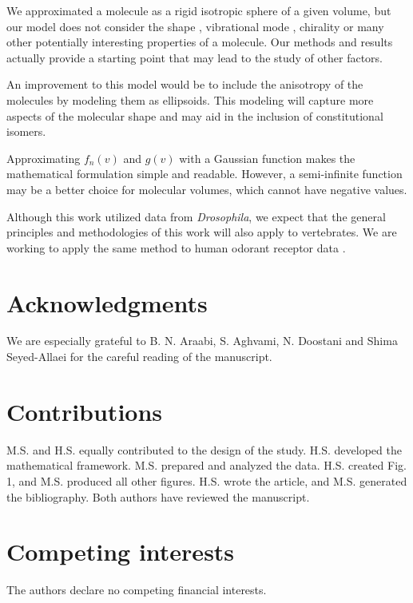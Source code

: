 \documentclass[fleqn,11pt]{wlscirep}
\begin{document}
We approximated a molecule as a rigid isotropic sphere of a given volume, but
our model does not consider the shape \cite{Keller2004, Araneda2000, uchida2000}, 
vibrational mode \cite{Turin,Franco2011,turin2015plausibility}, 
chirality \cite{tirandaz2015dissipative} or many other potentially interesting properties of a molecule.
Our methods and results actually provide a starting point that may lead to the study of other factors. 

An improvement to this model would be to include the anisotropy of the molecules 
by modeling them as ellipsoids. 
This modeling will capture more aspects of the molecular shape and may aid in the inclusion of constitutional isomers. 

Approximating $f_n(v)$ and $g(v)$ with a Gaussian function makes the mathematical formulation simple and readable. 
However, a semi-infinite function may be a better choice for molecular volumes, which cannot have negative values.

Although this work utilized data from \textit{Drosophila}, 
we expect that the general principles and methodologies of this work will also apply to vertebrates. 
We are working to apply the same method to human odorant receptor data \cite{mainland2015human}.

\section*{Acknowledgments}
We are especially grateful to B. N. Araabi, S. Aghvami, N. Doostani and Shima Seyed-Allaei for the careful reading of the manuscript.



\section*{Contributions}

M.S. and H.S. equally contributed to the design of the study. H.S. developed the mathematical framework. M.S. prepared and analyzed the data. H.S. created Fig. 1, and M.S. produced all other figures. H.S. wrote the article, and M.S. generated the bibliography. Both authors have reviewed the manuscript.

\section*{Competing interests}
The authors declare no competing financial interests.
\end{document}

